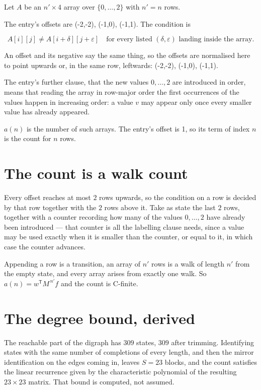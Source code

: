 \documentclass[11pt]{article}
\theoremstyle{definition}
\begin{document}
Let $A$ be an $n' \times 4$ array over $\{0,\dots,2\}$ with $n' = n$ rows.

The entry's offsets are (-2,-2), (-1,0), (-1,1). The condition is

\[A[i][j] \ne A[i{+}\delta][j{+}\varepsilon]\quad\text{for every listed }(\delta,\varepsilon)\text{ landing inside the array.}\]

An offset and its negative say the same thing, so the offsets are normalised here to point upwards or, in the same row, leftwards: (-2,-2), (-1,0), (-1,1).

The entry's further clause, that the new values $0,\dots,2$ are introduced in order, means that reading the array in row-major order the first occurrences of the values happen in increasing order: a value $v$ may appear only once every smaller value has already appeared.

$a(n)$ is the number of such arrays. The entry's offset is 1, so its term of index $n$ is the count for $n$ rows.

\section{The count is a walk count}

Every offset reaches at most $2$ rows upwards, so the condition on a row is decided by that row together with the $2$ rows above it. Take as state the last $2$ rows, together with a counter recording how many of the values $0,\dots,2$ have already been introduced --- that counter is all the labelling clause needs, since a value may be used exactly when it is smaller than the counter, or equal to it, in which case the counter advances.

Appending a row is a transition, an array of $n'$ rows is a walk of length $n'$ from the empty state, and every array arises from exactly one walk. So $a(n) = w^{\mathsf T}M^{\,n'}f$ and the count is C-finite.

\section{The degree bound, derived}

The reachable part of the digraph has $309$ states, $309$ after trimming. Identifying states with the same number of completions of every length, and then the mirror identification on the edges coming in, leaves $S = 23$ blocks, and the count satisfies the linear recurrence given by the characteristic polynomial of the resulting $23\times23$ matrix. That bound is computed, not assumed.
\end{document}
